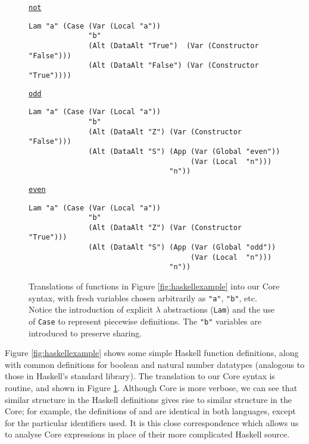 \begin{figure}
  \begin{small}
    \underline{\texttt{not}}
    \begin{verbatim}
Lam "a" (Case (Var (Local "a"))
              "b"
              (Alt (DataAlt "True")  (Var (Constructor "False")))
              (Alt (DataAlt "False") (Var (Constructor "True"))))
    \end{verbatim}

    \underline{\texttt{odd}}
    \begin{verbatim}
Lam "a" (Case (Var (Local "a"))
              "b"
              (Alt (DataAlt "Z") (Var (Constructor "False")))
              (Alt (DataAlt "S") (App (Var (Global "even"))
                                      (Var (Local  "n")))
                                 "n"))
    \end{verbatim}

    \underline{\texttt{even}}
    \begin{verbatim}
Lam "a" (Case (Var (Local "a"))
              "b"
              (Alt (DataAlt "Z") (Var (Constructor "True")))
              (Alt (DataAlt "S") (App (Var (Global "odd"))
                                      (Var (Local  "n")))
                                 "n"))
    \end{verbatim}
  \end{small}
  \caption{Translations of functions in Figure \ref{fig:haskellexample} into our
    Core syntax, with fresh variables chosen arbitrarily as \texttt{"a"},
    \texttt{"b"}, etc. Notice the introduction of explicit $\lambda$
    abstractions (\texttt{Lam}) and the use of \texttt{Case} to represent
    piecewise definitions. The \texttt{"b"} variables are introduced to preserve
    sharing.}
  \label{fig:coreexample}
\end{figure}

Figure \ref{fig:haskellexample} shows some simple Haskell function definitions,
along with common definitions for boolean and natural number datatypes
(analogous to those in Haskell's standard library). The translation to our Core
syntax is routine, and shown in Figure \ref{fig:coreexample}. Although Core is
more verbose, we can see that similar structure in the Haskell definitions gives
rise to similar structure in the Core; for example, the definitions of 
and  are identical in both languages, except for the particular
identifiers used. It is this close correspondence which allows us to analyse
Core expressions in place of their more complicated Haskell source.
